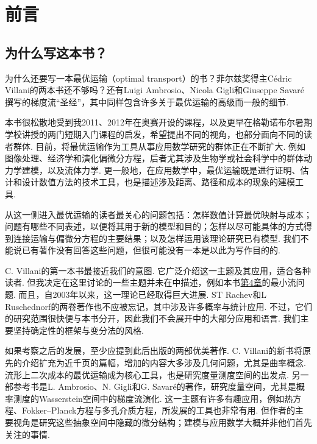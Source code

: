 \section*{前言}\label{sec:preface}
\subsection*{为什么写这本书？}
为什么还要写一本最优运输（optimal transport）的书？菲尔兹奖得主Cédric Villani的两本书还不够吗？还有Luigi Ambrosio、Nicola Gigli和Giuseppe Savaré撰写的梯度流“圣经”，其中同样包含许多关于最优运输的高级而一般的细节.

本书很松散地受到我2011、2012年在奥赛开设的课程，以及更早在格勒诺布尔暑期学校讲授的两门短期入门课程\cite{b274,b275}的启发，希望提出不同的视角，也部分面向不同的读者群体. 目前，将最优运输作为工具从事应用数学研究的群体正在不断扩大. 例如图像处理、经济学和演化偏微分方程，后者尤其涉及生物学或社会科学中的群体动力学建模，以及流体力学. 更一般地，在应用数学中，最优运输既是进行证明、估计和设计数值方法的技术工具，也是描述涉及距离、路径和成本的现象的建模工具.

从这一侧进入最优运输的读者最关心的问题包括：怎样数值计算最优映射与成本；问题有哪些不同表述，以便将其用于新的模型和目的；怎样以尽可能具体的方式得到连接运输与偏微分方程的主要结果；以及怎样运用该理论研究已有模型. 我们不能说已有著作没有回答这些问题，但很可能没有一本是以此为写作目的的.

C. Villani的第一本书\cite{b292}最接近我们的意图. 它广泛介绍这一主题及其应用，适合各种读者. 但我决定在这里讨论的一些主题并未在\cite{b292}中描述，例如本书\hyperref[sec:4]{第4章}的最小流问题. 而且，自2003年以来，这一理论已经取得巨大进展. ST Rachev和L Ruschednorf的两卷著作\cite{b257,b258}也不应被忘记，其中涉及许多概率与统计应用. 不过，它们的研究范围很快便与本书分开，因此我们不会展开\cite{b257}中的大部分应用和语言. 我们主要坚持确定性的框架与变分法的风格.

如果考察\cite{b292}之后的发展，至少应提到此后出版的两部优美著作. C. Villani的新书\cite{b293}将原先的介绍扩充为近千页的篇幅，增加的内容大多涉及几何问题，尤其是曲率概念. 流形上二次成本的最优运输成为核心工具，也是研究度量测度空间的出发点. 另一部参考书是L. Ambrosio、N. Gigli和G. Savaré的著作\cite{b15}，研究度量空间，尤其是概率测度的Wasserstein空间中的梯度流演化. 这一主题有许多有趣应用，例如热方程、Fokker--Planck方程与多孔介质方程，所发展的工具也非常有用. 但作者的主要视角是研究这些抽象空间中隐藏的微分结构；建模与应用数学大概并非他们首先关注的事情.

